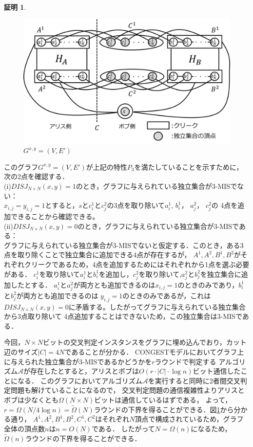 \documentclass[12pt]{thesis}
\newcommand{\CONGEST}{\textsf{CONGEST}}
\theoremstyle{definition}
\newtheorem*{prf*}{証明}
\begin{document}
\begin{prf*}
\begin{figure}[ht]
\begin{center}
\includegraphics[width=120mm]{3_Gxy.png}
\end{center}
\caption{$G^{x, y} = (V, E')$}
\label{3_G(x,y)}
\end{figure}

このグラフ$G^{x, y} = (V, E')$が上記の特性$P_{3}$を満たしていることを示すために，次の2点を確認する． \\
(i)$DISJ_{N \times N} (x, y) = 1$のとき，グラフに与えられている独立集合が3-MISでない： \\
$x_{i, j} = y_{i, j} =1$とすると，$s$と$c_{i}^{1}$と$c_{j}^{2}$の3点を取り除いて$a_{i}^{1}$, $b_{i}^{1}$， $a_{j}^{2}$， $c_{j}^{2}$の
4点を追加できることから確認できる。 \\
(ii)$DISJ_{N \times N} (x, y) = 0$のとき，グラフに与えられている独立集合が3-MISである： \\ 
グラフに与えられている独立集合が3-MISでないと仮定する．このとき，ある3点を取り除くことで独立集合に追加できる4点が存在するが，
$A^{1}, A^{2}, B^{1}, B^{2}$がそれぞれクリークであるため，4点を追加するためにはそれぞれから1点を選ぶ必要がある．
$c_{i}^{1}$を取り除いて$a_{i}^{1}$と$b_{i}^{1}$を追加し，$c_{j}^{2}$を取り除いて,$a_{j}^{2}$と$b_{j}^{2}$を独立集合に追加したとする．
$a_{i}^{1}$と$a_{j}^{2}$が両方とも追加できるのは$x_{i, j} = 1$のときのみであり，$b_{i}^{1}$と$b_{j}^{2}$が両方とも追加できるのは
$y_{i, j} = 1$のときのみであるが，これは$DISJ_{N \times N} (x, y) = 0$に矛盾する。したがってグラフに与えられている独立集合から3点取り除いて
4点追加することはできないため，この独立集合は3-MISである．

今回，$N \times N$ビットの交叉判定インスタンスをグラフに埋め込んでおり，カット辺のサイズ$|C| = 4N$であることが分かる．
{\CONGEST}モデルにおいてグラフ上に与えられた独立集合が3-MISであるかどうかを$r$ラウンドで判定する
アルゴリズム$\mathcal{A}$が存在したとすると，アリスとボブは$O(r \cdot |C| \cdot \log n)$ビット通信したことになる．
このグラフにおいてアルゴリズム$\mathcal{A}$を実行すると同時に2者間交叉判定問題も解けていることになるので，
交叉判定問題の通信複雑性よりアリスとボブは少なくとも$\Omega (N \times N)$ビットは通信しているはずである，
よって，$r = \Omega (N / 4\log n) = \tilde{\Omega}(N)$ラウンドの下界を得ることができる．図\ref{3_G(x,y)}から分かる通り，
$A^{1}, A^{2}, B^{1}, B^{2}, C^{1}, C^{2}$はそれぞれ$N$頂点で構成されているため，グラフ全体の頂点数$n$は$n = O(N)$である．
したがって$N = \Omega(n)$になるため，$\tilde{\Omega}(n)$ラウンドの下界を得ることができる．
\end{prf*}
\newpage
\end{document}
